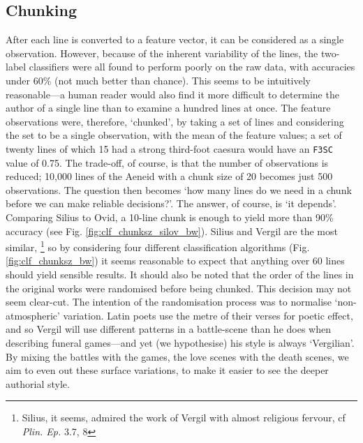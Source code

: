 \documentclass[11pt,a4paper]{scrartcl} %
\begin{document}
\subsection{Chunking}

After each line is converted to a feature vector, it can be considered as a single observation. However, because of the inherent variability of the lines, the two-label classifiers were all found to perform poorly on the raw data, with accuracies under 60\% (not much better than chance). This seems to be intuitively reasonable---a human reader would also find it more difficult to determine the author of a single line than to examine a hundred lines at once. The feature observations were, therefore, `chunked', by taking a set of lines and considering the set to be a single observation, with the mean of the feature values; a set of twenty lines of which 15 had a strong third-foot caesura would have an \texttt{F3SC} value of 0.75. The trade-off, of course, is that the number of observations is reduced; 10,000 lines of the Aeneid with a chunk size of 20 becomes just 500 observations. The question then becomes `how many lines do we need in a chunk before we can make reliable decisions?'. The answer, of course, is `it depends'. Comparing Silius to Ovid, a 10-line chunk is enough to yield more than 90\% accuracy (see Fig. \ref{fig:clf_chunksz_silov_bw}). Silius and Vergil are the most similar,%
\footnote{Silius, it seems, admired the work of Vergil with almost religious fervour, cf \textit{Plin. Ep.} 3.7, 8}
so by considering four different classification algorithms (Fig. \ref{fig:clf_chunksz_bw}) it seems reasonable to expect that anything over 60 lines should yield sensible results. It should also be noted that the order of the lines in the original works were randomised before being chunked. This decision may not seem clear-cut. The intention of the randomisation process was to normalise `non-atmospheric' variation. Latin poets use the metre of their verses for poetic effect, and so Vergil will use different patterns in a battle-scene than he does when describing funeral games---and yet (we hypothesise) his style is always `Vergilian'. By mixing the battles with the games, the love scenes with the death scenes, we aim to even out these surface variations, to make it easier to see the deeper authorial style.
\end{document}
